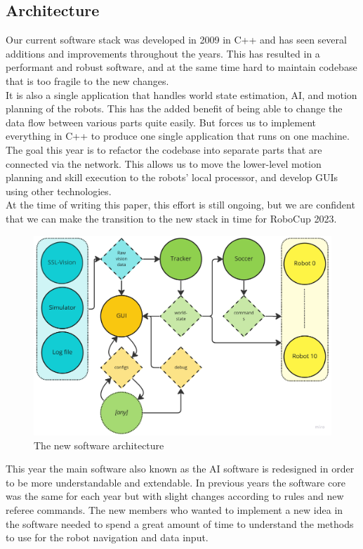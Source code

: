 \documentclass[runningheads]{llncs}
\begin{document}
\subsection{Architecture}
Our current software stack was developed in 2009 in C++ and has seen several additions and improvements throughout the years. This has resulted in a performant and robust software, and at the same time hard to maintain codebase that is too fragile to the new changes.\\
\indent It is also a single application that handles world state estimation, AI, and motion planning of the robots. This has the added benefit of being able to change the data flow between various parts quite easily. But forces us to implement everything in C++ to produce one single application that runs on one machine.\\
\indent The goal this year is to refactor the codebase into separate parts that are connected via the network. This allows us to move the lower-level motion planning and skill execution to the robots' local processor, and develop GUIs using other technologies. \\
\indent At the time of writing this paper, this effort is still ongoing, but we are confident that we can make the transition to the new stack in time for RoboCup 2023.

\begin{figure}
	\centering
	\includegraphics[width=1.0\textwidth]{images/software-architecture.jpg}
	\caption{The new software architecture}
	\label{fig:software-architecture}
\end{figure}

This year the main software also known as the AI software is redesigned in order to be more understandable and extendable. In previous years the software core was the same for each year but with slight changes according to rules and new referee commands. The new members who wanted to implement a new idea in the software needed to spend a great amount of time to understand the methods to use for the robot navigation and data input.
\end{document}
